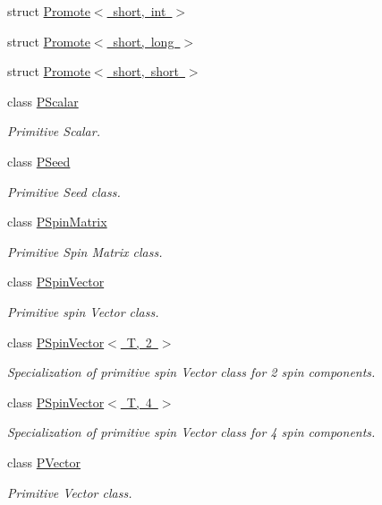 \begin{DoxyCompactItemize}
\item 
struct \mbox{\hyperlink{structENSEM_1_1Promote_3_01short_00_01int_01_4}{Promote$<$ short, int $>$}}
\item 
struct \mbox{\hyperlink{structENSEM_1_1Promote_3_01short_00_01long_01_4}{Promote$<$ short, long $>$}}
\item 
struct \mbox{\hyperlink{structENSEM_1_1Promote_3_01short_00_01short_01_4}{Promote$<$ short, short $>$}}
\item 
class \mbox{\hyperlink{classENSEM_1_1PScalar}{P\+Scalar}}
\begin{DoxyCompactList}\small\item\em Primitive Scalar. \end{DoxyCompactList}\item 
class \mbox{\hyperlink{classENSEM_1_1PSeed}{P\+Seed}}
\begin{DoxyCompactList}\small\item\em Primitive Seed class. \end{DoxyCompactList}\item 
class \mbox{\hyperlink{classENSEM_1_1PSpinMatrix}{P\+Spin\+Matrix}}
\begin{DoxyCompactList}\small\item\em Primitive Spin Matrix class. \end{DoxyCompactList}\item 
class \mbox{\hyperlink{classENSEM_1_1PSpinVector}{P\+Spin\+Vector}}
\begin{DoxyCompactList}\small\item\em Primitive spin Vector class. \end{DoxyCompactList}\item 
class \mbox{\hyperlink{classENSEM_1_1PSpinVector_3_01T_00_012_01_4}{P\+Spin\+Vector$<$ T, 2 $>$}}
\begin{DoxyCompactList}\small\item\em Specialization of primitive spin Vector class for 2 spin components. \end{DoxyCompactList}\item 
class \mbox{\hyperlink{classENSEM_1_1PSpinVector_3_01T_00_014_01_4}{P\+Spin\+Vector$<$ T, 4 $>$}}
\begin{DoxyCompactList}\small\item\em Specialization of primitive spin Vector class for 4 spin components. \end{DoxyCompactList}\item 
class \mbox{\hyperlink{classENSEM_1_1PVector}{P\+Vector}}
\begin{DoxyCompactList}\small\item\em Primitive Vector class. \end{DoxyCompactList}\item 

\end{DoxyCompactItemize}

